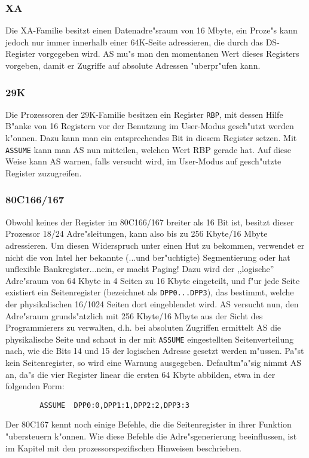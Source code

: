\documentclass[12pt,a4paper,twoside]{report}
\newcommand{\tty}[1]{{\tt #1}}
\begin{document}

\subsubsection{XA}

Die XA-Familie besitzt einen Datenadre"sraum von 16 Mbyte, ein Proze"s
kann jedoch nur immer innerhalb einer 64K-Seite adressieren, die
durch das DS-Register vorgegeben wird.  AS mu"s man den momentanen
Wert dieses Registers vorgeben, damit er Zugriffe auf absolute
Adressen "uberpr"ufen kann.


\subsubsection{29K}

Die Prozessoren der 29K-Familie besitzen ein Register \tty{RBP}, mit dessen
Hilfe B"anke von 16 Registern vor der Benutzung im User-Modus gesch"utzt
werden k"onnen.  Dazu kann man ein entsprechendes Bit in diesem Register
setzen.  Mit \tty{ASSUME} kann man AS nun mitteilen, welchen Wert RBP
gerade hat.  Auf diese Weise kann AS warnen, falls versucht wird, im
User-Modus auf gesch"utzte Register zuzugreifen.


\subsubsection{80C166/167}

Obwohl keines der Register im 80C166/167 breiter als 16 Bit ist, besitzt
dieser Prozessor 18/24 Adre"sleitungen, kann also bis zu 256 Kbyte/16 Mbyte
adressieren.  Um diesen Widerspruch unter einen Hut zu bekommen, verwendet
er nicht die von Intel her bekannte (...und ber"uchtigte) Segmentierung oder
hat unflexible Bankregister...nein, er macht Paging!  Dazu wird der ,,logische''
Adre"sraum von 64 Kbyte in 4 Seiten zu 16 Kbyte eingeteilt, und f"ur jede
Seite existiert ein Seitenregister (bezeichnet als \tty{DPP0...DPP3}), das
bestimmt, welche der physikalischen 16/1024 Seiten dort eingeblendet wird.  AS versucht
nun, den Adre"sraum grunds"atzlich mit 256 Kbyte/16 Mbyte aus der Sicht des
Programmierers zu verwalten, d.h. bei absoluten Zugriffen ermittelt AS die
physikalische Seite und schaut in der mit \tty{ASSUME} eingestellten
Seitenverteilung nach, wie die Bits 14 und 15 der logischen Adresse gesetzt
werden m"ussen.  Pa"st kein Seitenregister, so wird eine Warnung ausgegeben.
Defaultm"a"sig nimmt AS an, da"s die vier Register linear die ersten 64 Kbyte
abbilden, etwa in der folgenden Form:
\begin{verbatim}
        ASSUME  DPP0:0,DPP1:1,DPP2:2,DPP3:3
\end{verbatim}
Der 80C167 kennt noch einige Befehle, die die Seitenregister in ihrer
Funktion "ubersteuern k"onnen.  Wie diese Befehle die Adre"sgenerierung
beeinflussen, ist im Kapitel mit den prozessorspezifischen Hinweisen
beschrieben.
\end{document}
